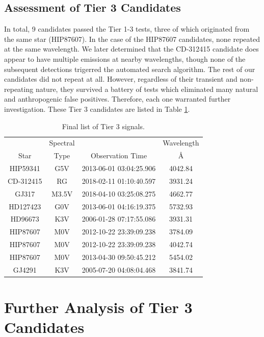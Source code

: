 \documentclass[twocolumn]{aastex701}
\begin{document}
\subsection{Assessment of Tier 3 Candidates}
\label{s:unexplained}
In total, 9 candidates passed the Tier 1-3 tests, three of which originated from the same star (HIP87607). In the case of the HIP87607 candidates, none repeated at the same wavelength. We later determined that the CD-312415 candidate does appear to have multiple emissions at nearby wavelengths, though none of the subsequent detections trigerred the automated search algorithm. The rest of our candidates did not repeat at all. However, regardless of their transient and non-repeating nature, they survived a battery of tests which eliminated many natural and anthropogenic false positives. Therefore, each one warranted further investigation. These Tier 3 candidates are listed in Table \ref{table:tier_3_candidates}.

\begin{table}
\begin{center}
\begin{tabular}{|c|c|c|c|} 
 \hline
& Spectral & & Wavelength\\
 Star & Type & Observation Time & \AA \\ 
\hline
 HIP59341 & G5V & 2013-06-01 03:04:25.906 & 4042.84\\
 CD-312415 & RG & 2018-02-11 01:10:40.597 & 3931.24\\ 
 GJ317 & M3.5V & 2018-04-10 03:25:08.275 &  4662.77\\ 
 HD127423 & G0V & 2013-06-01 04:16:19.375 &  5732.93\\
 HD96673 & K3V & 2006-01-28 07:17:55.086 & 3931.31\\
 HIP87607  & M0V & 2012-10-22 23:39:09.238 & 3784.09\\
 HIP87607  & M0V & 2012-10-22 23:39:09.238 & 4042.74\\
 HIP87607  & M0V & 2013-04-30 09:50:45.212 & 5454.02\\
 GJ4291 & K3V & 2005-07-20 04:08:04.468 & 3841.74\\
 \hline
 \end{tabular}
\end{center}
\caption{Final list of Tier 3 signals.}
\label{table:tier_3_candidates}
\end{table}

\section{Further Analysis of Tier 3 Candidates}
\end{document}
